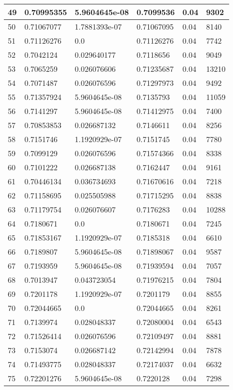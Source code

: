 \begin{longtable}{|l|l|l|l|l|l|}
49 & 0.70995355 & 5.9604645e-08 & 0.7099536 & 0.04 & 9302 \\ \hline 
50 & 0.71067077 & 1.7881393e-07 & 0.71067095 & 0.04 & 8140 \\ \hline 
51 & 0.71126276 & 0.0 & 0.71126276 & 0.04 & 7742 \\ \hline 
52 & 0.7042124 & 0.029640177 & 0.7118656 & 0.04 & 9049 \\ \hline 
53 & 0.7065259 & 0.026076606 & 0.71235687 & 0.04 & 13210 \\ \hline 
54 & 0.7071487 & 0.026076596 & 0.71297973 & 0.04 & 9492 \\ \hline 
55 & 0.71357924 & 5.9604645e-08 & 0.7135793 & 0.04 & 11059 \\ \hline 
56 & 0.7141297 & 5.9604645e-08 & 0.71412975 & 0.04 & 7400 \\ \hline 
57 & 0.70853853 & 0.026687132 & 0.7146611 & 0.04 & 8256 \\ \hline 
58 & 0.7151746 & 1.1920929e-07 & 0.7151745 & 0.04 & 7780 \\ \hline 
59 & 0.7099129 & 0.026076596 & 0.71574366 & 0.04 & 8338 \\ \hline 
60 & 0.7101222 & 0.026687138 & 0.7162447 & 0.04 & 9161 \\ \hline 
61 & 0.70446134 & 0.036734693 & 0.71670616 & 0.04 & 7218 \\ \hline 
62 & 0.71158695 & 0.025505988 & 0.71715295 & 0.04 & 8838 \\ \hline 
63 & 0.71179754 & 0.026076607 & 0.7176283 & 0.04 & 10288 \\ \hline 
64 & 0.7180671 & 0.0 & 0.7180671 & 0.04 & 7245 \\ \hline 
65 & 0.71853167 & 1.1920929e-07 & 0.7185318 & 0.04 & 6610 \\ \hline 
66 & 0.7189807 & 5.9604645e-08 & 0.71898067 & 0.04 & 9587 \\ \hline 
67 & 0.7193959 & 5.9604645e-08 & 0.71939594 & 0.04 & 7057 \\ \hline 
68 & 0.7013947 & 0.043723054 & 0.71976215 & 0.04 & 7804 \\ \hline 
69 & 0.7201178 & 1.1920929e-07 & 0.7201179 & 0.04 & 8855 \\ \hline 
70 & 0.72044665 & 0.0 & 0.72044665 & 0.04 & 8261 \\ \hline 
71 & 0.7139974 & 0.028048337 & 0.72080004 & 0.04 & 6543 \\ \hline 
72 & 0.71526414 & 0.026076596 & 0.72109497 & 0.04 & 8881 \\ \hline 
73 & 0.7153074 & 0.026687142 & 0.72142994 & 0.04 & 7878 \\ \hline 
74 & 0.71493775 & 0.028048337 & 0.72174037 & 0.04 & 6632 \\ \hline 
75 & 0.72201276 & 5.9604645e-08 & 0.7220128 & 0.04 & 7298 \\ \hline 
\end{longtable}